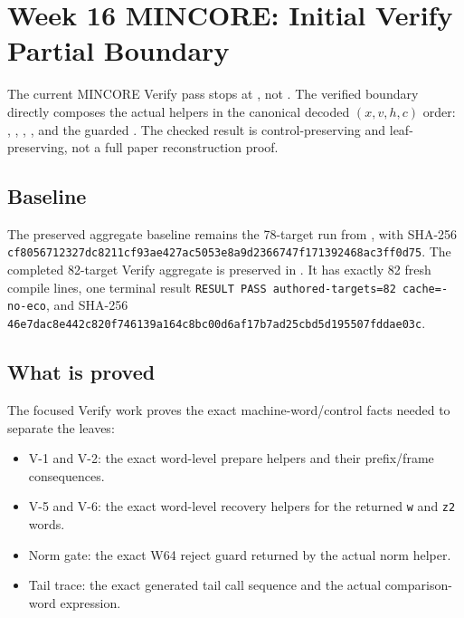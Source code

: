 \section{Week 16 MINCORE: Initial Verify Partial Boundary}

The current MINCORE Verify pass stops at
, not . The verified boundary
directly composes the actual helpers in the canonical decoded \((x,v,h,c)\)
order:
, ,
, ,
and the guarded . The checked result is
control-preserving and leaf-preserving, not a full paper reconstruction proof.

\subsection*{Baseline}

The preserved aggregate baseline remains the 78-target run from
, with SHA-256
\texttt{cf8056712327dc8211cf93ae427ac5053e8a9d2366747f171392468ac3ff0d75}.
The completed 82-target Verify aggregate is preserved in
. It has exactly 82 fresh compile
lines, one terminal result
\texttt{RESULT PASS authored-targets=82 cache=-no-eco}, and SHA-256
\texttt{46e7dac8e442c820f746139a164c8bc00d6af17b7ad25cbd5d195507fddae03c}.

\subsection*{What is proved}

The focused Verify work proves the exact machine-word/control facts needed to
separate the leaves:

\begin{itemize}
\item V-1 and V-2: the exact word-level prepare helpers and their prefix/frame
  consequences.
\item V-5 and V-6: the exact word-level recovery helpers for the returned
  \texttt{w} and \texttt{z2} words.
\item Norm gate: the exact W64 reject guard returned by the actual norm helper.
\item Tail trace: the exact generated tail call sequence and the actual
  comparison-word expression.
\end{itemize}

